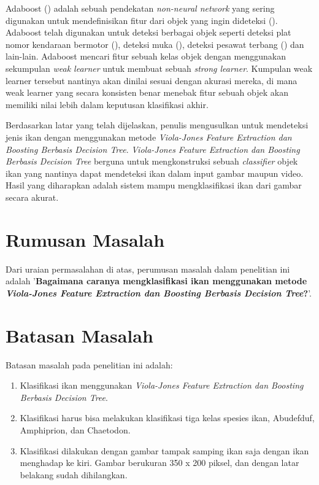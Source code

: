 Adaboost (\cite{freundetal}) adalah sebuah pendekatan \textit{non-neural network} 
yang sering digunakan untuk mendefinisikan fitur dari objek yang ingin 
dideteksi (\cite{weber}). Adaboost telah digunakan untuk deteksi berbagai objek 
seperti deteksi plat nomor kendaraan bermotor (\cite{hoetal}), deteksi muka 
(\cite{violaetal}), deteksi pesawat terbang (\cite{freundetal}) dan lain-lain. 
Adaboost mencari fitur sebuah kelas objek dengan menggunakan sekumpulan 
\emph{weak learner} untuk membuat sebuah \emph{strong learner}. 
Kumpulan weak learner tersebut nantinya akan dinilai sesuai dengan akurasi 
mereka, di mana weak learner yang secara konsisten benar menebak fitur sebuah 
objek akan memiliki nilai lebih dalam keputusan klasifikasi akhir.

Berdasarkan latar yang telah dijelaskan, penulis mengusulkan untuk mendeteksi 
jenis ikan dengan menggunakan metode \emph{Viola-Jones Feature Extraction dan Boosting Berbasis 
	Decision Tree}. 
\emph{Viola-Jones Feature Extraction dan Boosting Berbasis 
	Decision Tree} berguna untuk 
mengkonstruksi sebuah \emph{classifier} objek ikan yang nantinya dapat mendeteksi 
ikan dalam input gambar maupun video. Hasil yang diharapkan adalah sistem 
mampu mengklasifikasi ikan dari gambar secara akurat.

\section{Rumusan Masalah}
Dari uraian permasalahan di atas, perumusan masalah dalam penelitian ini adalah 
'\textbf{Bagaimana caranya mengklasifikasi ikan menggunakan metode 
\textit{Viola-Jones Feature Extraction dan Boosting Berbasis 
	Decision Tree}?}'.

\section{Batasan Masalah}
Batasan masalah pada penelitian ini adalah:
\begin{enumerate}
	\item Klasifikasi ikan menggunakan \textit{Viola-Jones Feature Extraction dan Boosting Berbasis 
	Decision Tree}.
	\item Klasifikasi harus bisa melakukan klasifikasi tiga kelas spesies ikan, Abudefduf, Amphiprion, dan Chaetodon.
	\item Klasifikasi dilakukan dengan gambar tampak samping ikan saja dengan ikan menghadap ke kiri. Gambar 
	berukuran 350 x 200 piksel, dan dengan latar belakang sudah dihilangkan.
\end{enumerate}

